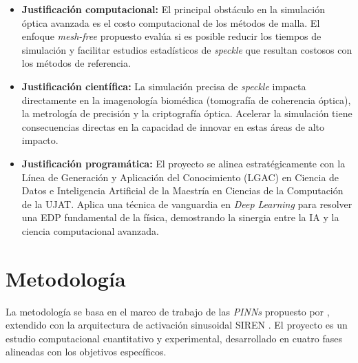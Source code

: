 \begin{itemize}
    \item \textbf{Justificación computacional:} El principal obstáculo en la
    simulación óptica avanzada es el costo computacional de los métodos de
    malla. El enfoque \textit{mesh-free} propuesto evalúa si es posible reducir
    los tiempos de simulación y facilitar estudios estadísticos de \textit{speckle}
    que resultan costosos con los métodos de referencia.

    \item \textbf{Justificación científica:} La simulación precisa de
    \textit{speckle} impacta directamente en la imagenología biomédica
    (tomografía de coherencia óptica), la metrología de precisión y la
    criptografía óptica. Acelerar la simulación tiene consecuencias directas en
    la capacidad de innovar en estas áreas de alto impacto.

    \item \textbf{Justificación programática:} El proyecto se alinea
    estratégicamente con la Línea de Generación y Aplicación del Conocimiento
    (LGAC) en Ciencia de Datos e Inteligencia Artificial de la Maestría en
    Ciencias de la Computación de la UJAT. Aplica una técnica de vanguardia en
    \textit{Deep Learning} para resolver una EDP fundamental de la física,
    demostrando la sinergia entre la IA y la ciencia computacional avanzada.
\end{itemize}

\section{Metodología}

La metodología se basa en el marco de trabajo de las \textit{PINNs} propuesto
por \textcite{raissi2019physics}, extendido con la arquitectura de activación
sinusoidal SIREN \parencite{sitzmann2020siren}. El proyecto es un estudio
computacional cuantitativo y experimental, desarrollado en cuatro fases
alineadas con los objetivos específicos.

